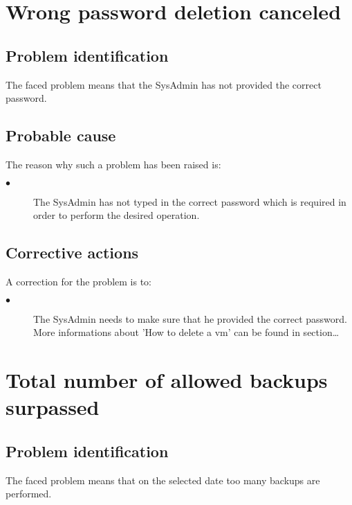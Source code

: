 \section{Wrong password deletion canceled} 

\subsection{Problem identification}
The faced problem means that the SysAdmin has not provided the correct password.

\subsection{Probable cause}

The reason why such a problem has been raised is:\\
\begin{description}
\item[$\bullet$] The SysAdmin has not typed in the correct password which is
required in order to perform the desired operation.
\end{description}


\subsection{Corrective actions}

A correction for the problem is to:\\
\begin{description}
\item[$\bullet$] The SysAdmin needs to make sure that he provided the correct
password. More informations about 'How to delete a vm' can be found in
section\ldots

\end{description}











\section{Total number of allowed backups surpassed} 

\subsection{Problem identification}
The faced problem means that on the selected date too many backups are
performed.

